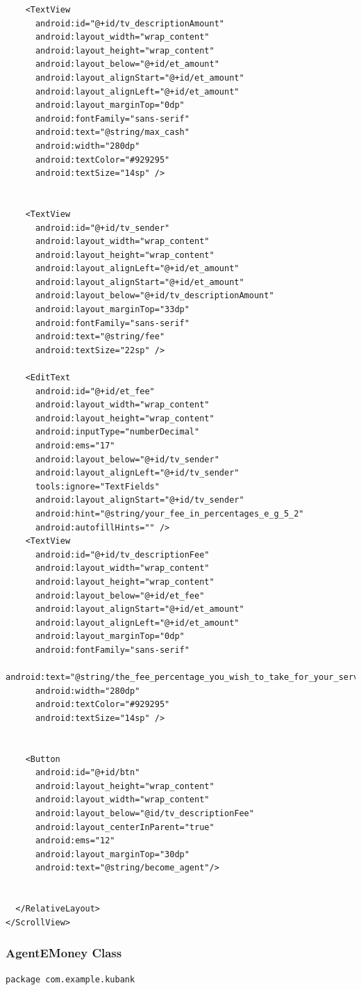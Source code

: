 \documentclass[11pt, a4paper]{article}
\begin{document}
\begin{appendices}
\begin{lstlisting}
    <TextView
      android:id="@+id/tv_descriptionAmount"
      android:layout_width="wrap_content"
      android:layout_height="wrap_content"
      android:layout_below="@+id/et_amount"
      android:layout_alignStart="@+id/et_amount"
      android:layout_alignLeft="@+id/et_amount"
      android:layout_marginTop="0dp"
      android:fontFamily="sans-serif"
      android:text="@string/max_cash"
      android:width="280dp"
      android:textColor="#929295"
      android:textSize="14sp" />


    <TextView
      android:id="@+id/tv_sender"
      android:layout_width="wrap_content"
      android:layout_height="wrap_content"
      android:layout_alignLeft="@+id/et_amount"
      android:layout_alignStart="@+id/et_amount"
      android:layout_below="@+id/tv_descriptionAmount"
      android:layout_marginTop="33dp"
      android:fontFamily="sans-serif"
      android:text="@string/fee"
      android:textSize="22sp" />

    <EditText
      android:id="@+id/et_fee"
      android:layout_width="wrap_content"
      android:layout_height="wrap_content"
      android:inputType="numberDecimal"
      android:ems="17"
      android:layout_below="@+id/tv_sender"
      android:layout_alignLeft="@+id/tv_sender"
      tools:ignore="TextFields"
      android:layout_alignStart="@+id/tv_sender"
      android:hint="@string/your_fee_in_percentages_e_g_5_2"
      android:autofillHints="" />
    <TextView
      android:id="@+id/tv_descriptionFee"
      android:layout_width="wrap_content"
      android:layout_height="wrap_content"
      android:layout_below="@+id/et_fee"
      android:layout_alignStart="@+id/et_amount"
      android:layout_alignLeft="@+id/et_amount"
      android:layout_marginTop="0dp"
      android:fontFamily="sans-serif"
      android:text="@string/the_fee_percentage_you_wish_to_take_for_your_service"
      android:width="280dp"
      android:textColor="#929295"
      android:textSize="14sp" />


    <Button
      android:id="@+id/btn"
      android:layout_height="wrap_content"
      android:layout_width="wrap_content"
      android:layout_below="@id/tv_descriptionFee"
      android:layout_centerInParent="true"
      android:ems="12"
      android:layout_marginTop="30dp"
      android:text="@string/become_agent"/>


  </RelativeLayout>
</ScrollView>
\end{lstlisting}
\subsubsection{AgentEMoney Class}
\begin{lstlisting}
package com.example.kubank


\end{lstlisting}
\end{appendices}
\end{document}
